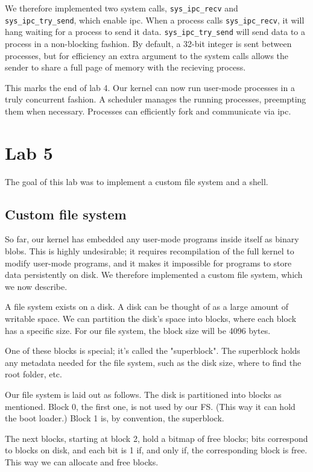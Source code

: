 \documentclass{article}
\begin{document}
We therefore implemented two system calls, \texttt{sys\_ipc\_recv} and
\texttt{sys\_ipc\_try\_send}, which enable \gls{ipc}. When a process calls 
\texttt{sys\_ipc\_recv}, it will hang waiting for a process to send it data.
\texttt{sys\_ipc\_try\_send} will send data to a process in a non-blocking
fashion. By default, a 32-bit integer is sent between processes, but for
efficiency an extra argument to the system calls allows the sender to share a
full page of memory with the recieving process.


This marks the end of lab 4. Our kernel can now run user-mode processes in a
truly concurrent fashion. A scheduler manages the running processes,
preempting them when necessary. Processes can efficiently fork and communicate
via \gls{ipc}.


\section{Lab 5}
The goal of this lab was to implement a custom file system and a shell.

\subsection{Custom file system}
So far, our kernel has embedded any user-mode programs inside itself as binary
blobs. This is highly undesirable; it requires recompilation of the full
kernel to modify user-mode programs, and it makes it impossible for programs
to store data persistently on disk. We therefore implemented a custom file
system, which we now describe.

A file system exists on a disk. A disk can be thought of as a large amount of
writable space. We can partition the disk's space into blocks, where each
block has a specific size. For our file system, the block size will be 4096
bytes.

One of these blocks is special; it's called the "superblock". The superblock
holds any metadata needed for the file system, such as the disk size, where to
find the root folder, etc.

Our file system is laid out as follows. The disk is partitioned into blocks as
mentioned. Block 0, the first one, is not used by our FS. (This way it can
hold the boot loader.) Block 1 is, by convention, the superblock. 

The next blocks, starting at block 2, hold a bitmap of free blocks; bits
correspond to blocks on disk, and each bit is 1 if, and only if, the
corresponding block is free. This way we can allocate and free blocks.
\end{document}
